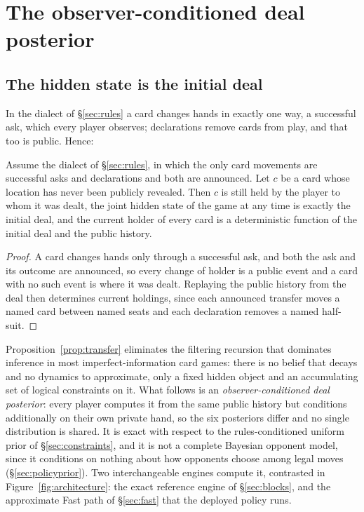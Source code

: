 \section{The observer-conditioned deal posterior}
\label{sec:belief}

\subsection{The hidden state is the initial deal}

In the dialect of \S\ref{sec:rules} a card changes hands in exactly one way, a
successful ask, which every player observes; declarations remove cards from
play, and that too is public. Hence:

\begin{proposition}
\label{prop:transfer}
Assume the dialect of \S\ref{sec:rules}, in which the only card movements are
successful asks and declarations and both are announced. Let $c$ be a card whose
location has never been publicly revealed. Then $c$ is still held by the player to
whom it was dealt, the joint hidden state of the game at any time is exactly the
initial deal, and the current holder of every card is a deterministic function of
the initial deal and the public history.
\end{proposition}

\begin{proof}
A card changes hands only through a successful ask, and both the ask and its
outcome are announced, so every change of holder is a public event and a card
with no such event is where it was dealt. Replaying the public history from the
deal then determines current holdings, since each announced transfer moves a
named card between named seats and each declaration removes a named half-suit.
\end{proof}

Proposition~\ref{prop:transfer} eliminates the filtering recursion that
dominates inference in most imperfect-information card games: there is no
belief that decays and no dynamics to approximate, only a fixed hidden object
and an accumulating set of logical constraints on it. What follows is an
\emph{observer-conditioned deal posterior}: every player computes it from the
same public history but conditions additionally on their own private hand, so
the six posteriors differ and no single distribution is shared. It is exact
with respect to the rules-conditioned uniform prior of
\S\ref{sec:constraints}, and it is not a complete Bayesian opponent model,
since it conditions on nothing about how opponents choose among legal moves
(\S\ref{sec:policyprior}). Two interchangeable engines compute it, contrasted
in Figure~\ref{fig:architecture}: the exact reference engine of
\S\ref{sec:blocks}, and the approximate Fast path of \S\ref{sec:fast} that the
deployed \vfast{} policy runs.

